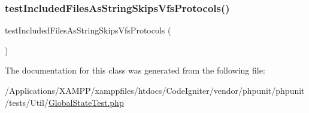 \subsubsection{\texorpdfstring{test\+Included\+Files\+As\+String\+Skips\+Vfs\+Protocols()}{testIncludedFilesAsStringSkipsVfsProtocols()}}
{\footnotesize\ttfamily test\+Included\+Files\+As\+String\+Skips\+Vfs\+Protocols (\begin{DoxyParamCaption}{ }\end{DoxyParamCaption})}



The documentation for this class was generated from the following file\+:\begin{DoxyCompactItemize}
\item 
/\+Applications/\+X\+A\+M\+P\+P/xamppfiles/htdocs/\+Code\+Igniter/vendor/phpunit/phpunit/tests/\+Util/\mbox{\hyperlink{_global_state_test_8php}{Global\+State\+Test.\+php}}\end{DoxyCompactItemize}
